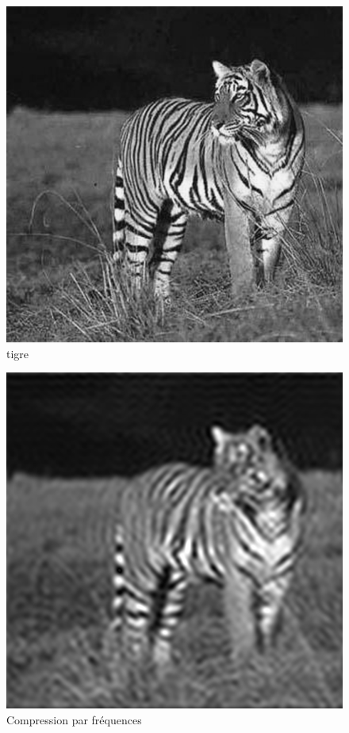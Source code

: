 \documentclass{article}
\begin{document}
\begin{figure}
	\begin{center}
		\includegraphics[scale=0.4]{tigre_512}\\
		tigre
	\end{center}
\end{figure}
\begin{figure}
	\begin{center}
		\includegraphics[scale=0.4]{tigre_compresse}\\
		Compression par fréquences
	\end{center}
\end{figure}
\end{document}
